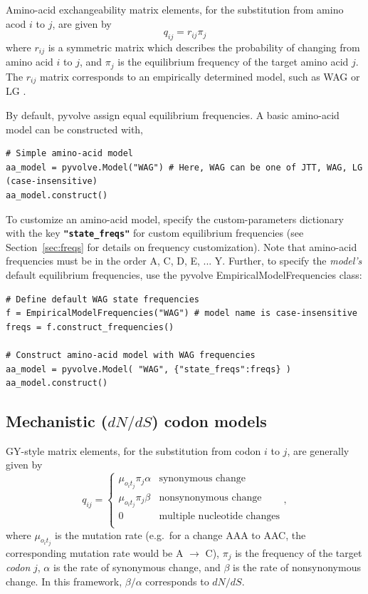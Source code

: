 \documentclass{article}
\newcommand{\code}[1]{\textbf{\texttt{\small{#1}}}}
\begin{document}
Amino-acid exchangeability matrix elements, for the substitution from amino acod $i$ to $j$, are given by 
\begin{equation}
q_{ij} = r_{ij} \pi_j
\end{equation}
where $r_{ij}$ is a symmetric matrix which describes the probability of changing from amino acid $i$ to $j$, and $\pi_j$ is the equilibrium frequency of the target amino acid $j$. The $r_{ij}$ matrix corresponds to an empirically determined model, such as WAG \citep{WAG} or LG \citep{LG}. 

By default, pyvolve assign equal equilibrium frequencies. A basic amino-acid model can be constructed with, 
\begin{lstlisting}
# Simple amino-acid model 
aa_model = pyvolve.Model("WAG") # Here, WAG can be one of JTT, WAG, LG (case-insensitive)
aa_model.construct()
\end{lstlisting}

To customize an amino-acid model, specify the custom-parameters dictionary with the key \code{"state\_freqs"} for custom equilibrium frequencies (see Section~\ref{sec:freqs} for details on frequency customization). Note that amino-acid frequencies must be in the order A, C, D, E, ... Y. Further, to specify the \textit{model's} default equilibrium frequencies, use the pyvolve EmpiricalModelFrequencies class:
\begin{lstlisting}
# Define default WAG state frequencies
f = EmpiricalModelFrequencies("WAG") # model name is case-insensitive
freqs = f.construct_frequencies()

# Construct amino-acid model with WAG frequencies
aa_model = pyvolve.Model( "WAG", {"state_freqs":freqs} )
aa_model.construct()
\end{lstlisting}



\subsection{Mechanistic ($dN/dS$) codon models}\label{sec:mechcodon_basic}

GY-style \citep{GY94} matrix elements, for the substitution from codon $i$ to $j$, are generally given by 
\begin{equation}\label{eq:GY94}
q_{ij} = \left\{ 
\begin{array}{rl}
\mu_{o_it_j} \pi_j \alpha      & \text{synonymous change} \\
\mu_{o_it_j} \pi_j \beta       & \text{nonsynonymous change} \\
0                    & \text{multiple nucleotide changes} \\             
\end{array} \right.,
\end{equation}
where $\mu_{o_it_j}$ is the mutation rate (e.g.\ for a change AAA to AAC, the corresponding mutation rate would be A $\rightarrow$ C), $\pi_j$ is the frequency of the target \emph{codon} $j$, $\alpha$ is the rate of synonymous change, and $\beta$ is the rate of nonsynonymous change. In this framework, $\beta / \alpha$ corresponds to $dN/dS$.
\end{document}
